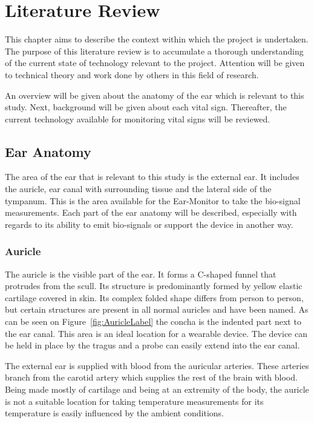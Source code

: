 \chapter{Literature Review}
\label{chp:LitReview}
This chapter aims to describe the context within which the project is undertaken. The purpose of this literature review is to accumulate a thorough understanding of the current state of technology relevant to the project. Attention will be given to technical theory and work done by others in this field of research.

\medskip

An overview will be given about the anatomy of the ear which is relevant to this study. Next, background will be given about each vital sign. Thereafter, the current technology available for monitoring vital signs will be reviewed.

\section{Ear Anatomy} %
The area of the ear that is relevant to this study is the external ear. It includes the auricle, ear canal with surrounding tissue and the lateral side of the tympanum. This is the area available for the Ear-Monitor to take the bio-signal measurements. Each part of the ear anatomy will be described, especially with regards to its ability to emit bio-signals or support the device in another way.

\subsection{Auricle}
The auricle is the visible part of the ear. It forms a C-shaped funnel that protrudes from the scull. Its structure is predominantly formed by yellow elastic cartilage covered in skin. Its complex folded shape differs from person to person, but certain structures are present in all normal auricles and have been named. As can be seen on Figure~\ref{fig:AuricleLabel} the concha is the indented part next to the ear canal. This area is an ideal location for a wearable device. The device can be held in place by the tragus and a probe can easily extend into the ear canal.

\medskip

The external ear is supplied with blood from the auricular arteries. These arteries branch from the carotid artery which supplies the rest of the brain with blood. Being made mostly of cartilage and being at an extremity of the body, the auricle is not a suitable location for taking temperature measurements for its temperature is easily influenced by the ambient conditions.


